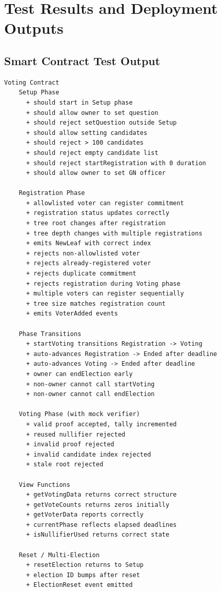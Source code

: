 \chapter{Test Results and Deployment Outputs}\label{app:tests}

\section{Smart Contract Test Output}

\begin{lstlisting}[caption={Complete Hardhat test suite output (54 tests passing)}]
  Voting Contract
    Setup Phase
      + should start in Setup phase
      + should allow owner to set question
      + should reject setQuestion outside Setup
      + should allow setting candidates
      + should reject > 100 candidates
      + should reject empty candidate list
      + should reject startRegistration with 0 duration
      + should allow owner to set GN officer

    Registration Phase
      + allowlisted voter can register commitment
      + registration status updates correctly
      + tree root changes after registration
      + tree depth changes with multiple registrations
      + emits NewLeaf with correct index
      + rejects non-allowlisted voter
      + rejects already-registered voter
      + rejects duplicate commitment
      + rejects registration during Voting phase
      + multiple voters can register sequentially
      + tree size matches registration count
      + emits VoterAdded events

    Phase Transitions
      + startVoting transitions Registration -> Voting
      + auto-advances Registration -> Ended after deadline
      + auto-advances Voting -> Ended after deadline
      + owner can endElection early
      + non-owner cannot call startVoting
      + non-owner cannot call endElection

    Voting Phase (with mock verifier)
      + valid proof accepted, tally incremented
      + reused nullifier rejected
      + invalid proof rejected
      + invalid candidate index rejected
      + stale root rejected

    View Functions
      + getVotingData returns correct structure
      + getVoteCounts returns zeros initially
      + getVoterData reports correctly
      + currentPhase reflects elapsed deadlines
      + isNullifierUsed returns correct state

    Reset / Multi-Election
      + resetElection returns to Setup
      + election ID bumps after reset
      + ElectionReset event emitted


\end{lstlisting}
